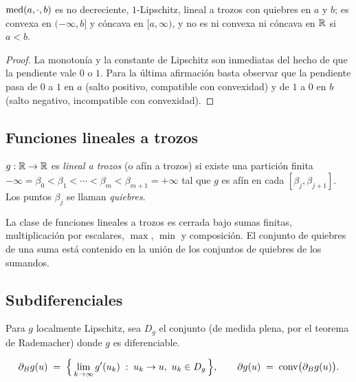\begin{lemma}
\label{lem:recorte}
$\operatorname{med}(a,\cdot,b)$ es no decreciente, $1$-Lipschitz, lineal a trozos con quiebres
en $a$ y $b$; es convexa en $(-\infty,b]$ y cóncava en $[a,\infty)$, y no es ni
convexa ni cóncava en $\mathbb{R}$ si $a<b$.
\end{lemma}
\begin{proof}
La monotonía y la constante de Lipschitz son inmediatas del hecho de que la
pendiente vale $0$ o $1$. Para la última afirmación basta observar que la
pendiente pasa de $0$ a $1$ en $a$ (salto positivo, compatible con convexidad) y
de $1$ a $0$ en $b$ (salto negativo, incompatible con convexidad).
\end{proof}

\subsection{Funciones lineales a trozos}

\begin{definition}
$g:\mathbb{R}\to\mathbb{R}$ es \emph{lineal a trozos} (o afín a trozos) si existe una partición
finita $-\infty=\beta_0<\beta_1<\cdots<\beta_m<\beta_{m+1}=+\infty$ tal que $g$ es
afín en cada $[\beta_j,\beta_{j+1}]$. Los puntos $\beta_j$ se llaman
\emph{quiebres}.
\end{definition}

\begin{lemma}
\label{lem:pl-cerrado}
La clase de funciones lineales a trozos es cerrada bajo sumas finitas,
multiplicación por escalares, $\max$, $\min$ y composición. El conjunto de
quiebres de una suma está contenido en la unión de los conjuntos de quiebres de
los sumandos.
\end{lemma}

\subsection{Subdiferenciales}

Para $g$ localmente Lipschitz, sea $D_g$ el conjunto (de medida plena, por el
teorema de Rademacher) donde $g$ es diferenciable.

\begin{definition}
\[
  \partial_B g(u)\;=\;\Bigl\{\, \lim_{k\to\infty} g'(u_k)\;:\; u_k\to u,\ u_k\in D_g \,\Bigr\},
  \qquad
  \partial g(u)\;=\;\operatorname{conv}\bigl(\partial_B g(u)\bigr).
\]
\end{definition}

